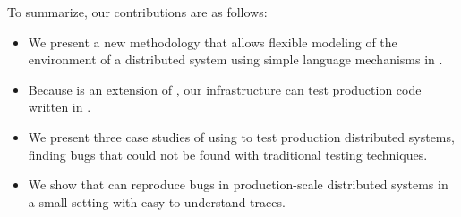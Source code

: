 To summarize, our contributions are as follows:
\begin{itemize}
\item We present a new methodology that allows flexible modeling of the environment of a distributed system using simple language mechanisms in \psharp.
\item Because \psharp is an extension of \csharp, our infrastructure can test production code written in \csharp.
\item We present three case studies of using \psharp to test production distributed systems, finding bugs that could not be found with traditional testing techniques.
\item We show that \psharp can reproduce bugs in production-scale distributed systems in a small setting with easy to understand traces.
\end{itemize}

